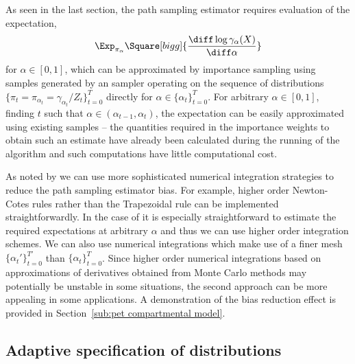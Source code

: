 As seen in the last section, the path sampling estimator requires evaluation of the expectation,
\begin{equation*}
  \Exp_{\pi_\alpha}\Square[bigg]{
    \frac{\diff\log\gamma_{\alpha}(X)}{\diff\alpha}}
\end{equation*}
for $\alpha\in[0,1]$, which can be approximated by importance sampling using samples generated by an \smc sampler operating on the sequence of distributions $\{\pi_t = \pi_{\alpha_t} = \gamma_{\alpha_t}/Z_t\}_{t=0}^T$ directly for $\alpha\in\{\alpha_t\}_{t=0}^T$. For arbitrary $\alpha\in[0,1]$, finding $t$ such that $\alpha\in(\alpha_{t-1},\alpha_t)$, the expectation can be easily approximated using existing \smc samples -- the quantities required in the importance weights to obtain such an estimate have already been calculated during the running of the \smc algorithm and such computations have little computational cost.

As noted by \cite{Friel:2012} we can use more sophisticated numerical integration strategies to reduce the path sampling estimator bias. For example, higher order Newton-Cotes rules rather than the Trapezoidal rule can be implemented straightforwardly. In the case of \smc it is especially straightforward to estimate the required expectations at arbitrary $\alpha$ and thus we can use higher order integration schemes. We can also use numerical integrations which make use of a finer mesh $\{\alpha_t'\}_{t=0}^{T'}$ than $\{\alpha_t\}_{t=0}^T$. Since higher order numerical integrations based on approximations of derivatives obtained from Monte Carlo methods may potentially be unstable in some situations, the second approach can be more appealing in some applications. A demonstration of the bias reduction effect is provided in Section~\ref{sub:pet compartmental model}.

\subsection{Adaptive specification of distributions}
\label{sub:Adaptive specification of distributions}

